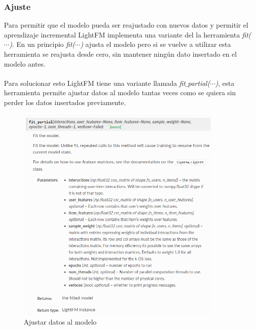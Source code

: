 \subsubsection{Ajuste}
Para permitir que el modelo pueda ser reajustado con nuevos datos y permitir el aprendizaje incremental LightFM implementa una variante del la herramienta \textit{fit($\cdots$)}. En un principio \textit{fit($\cdots$)} ajusta el modelo pero si se vuelve a utilizar esta herramienta se reajusta desde cero, sin mantener ningún dato insertado en el modelo antes.
\\ \\
Para solucionar esto LightFM tiene una variante llamada \textit{fit$\_$partial($\cdots$)}, esta herramienta permite ajustar datos al modelo tantas veces como se quiera sin perder los datos insertados previamente.
\begin{figure}[H]
    \centering
    \includegraphics[width=0.9\textwidth]{Figuras/LightFM_fit_partial.png}    
    \caption{Ajustar datos al modelo} 
    \label{fig:FitPartial}
\end{figure}

